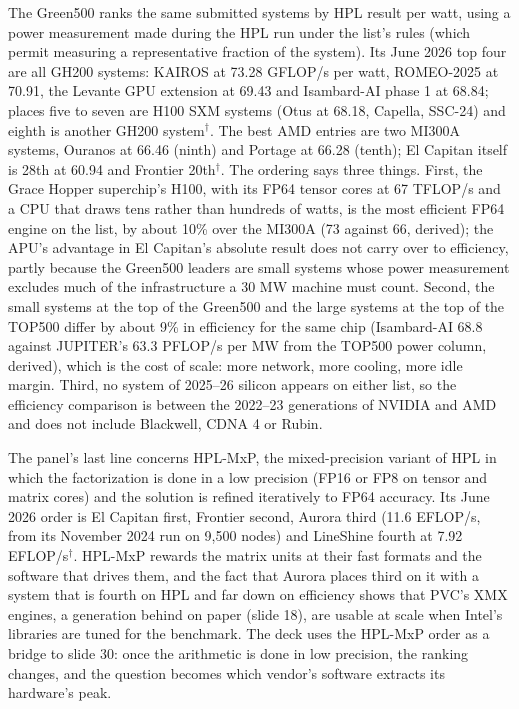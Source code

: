 \documentclass[11pt,letterpaper]{article}
\begin{document}
The Green500 ranks the same submitted systems by HPL result per watt, using a power measurement made during the HPL run under the list's rules (which permit measuring a representative fraction of the system). Its June 2026 top four are all GH200 systems: KAIROS at 73.28 GFLOP/s per watt, ROMEO-2025 at 70.91, the Levante GPU extension at 69.43 and Isambard-AI phase 1 at 68.84; places five to seven are H100 SXM systems (Otus at 68.18, Capella, SSC-24) and eighth is another GH200 system$^\dagger$. The best AMD entries are two MI300A systems, Ouranos at 66.46 (ninth) and Portage at 66.28 (tenth); El Capitan itself is 28th at 60.94 and Frontier 20th$^\dagger$. The ordering says three things. First, the Grace Hopper superchip's H100, with its FP64 tensor cores at 67 TFLOP/s and a CPU that draws tens rather than hundreds of watts, is the most efficient FP64 engine on the list, by about 10\% over the MI300A (73 against 66, derived); the APU's advantage in El Capitan's absolute result does not carry over to efficiency, partly because the Green500 leaders are small systems whose power measurement excludes much of the infrastructure a 30 MW machine must count. Second, the small systems at the top of the Green500 and the large systems at the top of the TOP500 differ by about 9\% in efficiency for the same chip (Isambard-AI 68.8 against JUPITER's 63.3 PFLOP/s per MW from the TOP500 power column, derived), which is the cost of scale: more network, more cooling, more idle margin. Third, no system of 2025--26 silicon appears on either list, so the efficiency comparison is between the 2022--23 generations of NVIDIA and AMD and does not include Blackwell, CDNA 4 or Rubin.

The panel's last line concerns HPL-MxP, the mixed-precision variant of HPL in which the factorization is done in a low precision (FP16 or FP8 on tensor and matrix cores) and the solution is refined iteratively to FP64 accuracy. Its June 2026 order is El Capitan first, Frontier second, Aurora third (11.6 EFLOP/s, from its November 2024 run on 9,500 nodes) and LineShine fourth at 7.92 EFLOP/s$^\dagger$. HPL-MxP rewards the matrix units at their fast formats and the software that drives them, and the fact that Aurora places third on it with a system that is fourth on HPL and far down on efficiency shows that PVC's XMX engines, a generation behind on paper (slide 18), are usable at scale when Intel's libraries are tuned for the benchmark. The deck uses the HPL-MxP order as a bridge to slide 30: once the arithmetic is done in low precision, the ranking changes, and the question becomes which vendor's software extracts its hardware's peak.
\end{document}
